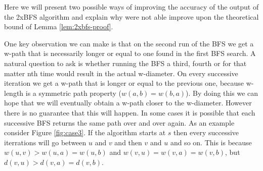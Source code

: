 
Here we will present two possible ways of improving the accuracy of the output of the 2xBFS algorithm and explain why were not able improve upon the theoretical bound of Lemma \ref{lem:2xbfs-proof}.

One key observation we can make is that on the second run of the BFS we get a w-path that is necessarily longer or equal to one found in the first BFS search. A natural question to ask is whether running the BFS a third, fourth or for that matter nth time would result in the actual w-diameter. On every successive iteration we get a w-path that is longer or equal to the previous one, because w-length is a symmetric path property ($w(a, b) = w(b, a)$). By doing this we can hope that we will eventually obtain a w-path closer to the w-diameter. However there is no guarantee that this will happen. In some cases it is possible that each successive BFS returns the same path over and over again. As an example consider Figure \ref{fig:case3}. If the algorithm starts at $s$ then every successive iterrations will go between $u$ and $v$ and then $v$ and $u$ and so on.
This is because $w(u,v) > w(u, a) = w(u, b)$ and $w(v, u) = w(v, a) = w(v, b)$, but $d(v, u) > d(v, a) = d(v, b)$.

